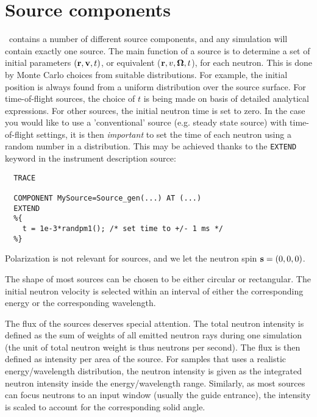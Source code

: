 
\chapter{Source components}
\label{c:source}

\MCS\ contains a number of different source components,
and any simulation will contain exactly one source.
The main function of a source is to determine a set of initial
parameters $({\bf r}, {\bf v}, t)$, or equivalent (${\bf r}, v, \mbox{\boldmath $\Omega$} , t $),
for each neutron. This is done by Monte Carlo choices from
suitable distributions. For example, the initial position is
always found from a uniform distribution over the source surface.
For time-of-flight sources, the choice of $t$ is being made on basis of
detailed analytical expressions.
For other sources, the initial neutron time is set to zero. In the case you would like to use a 'conventional' source (e.g. steady state source) with time-of-flight settings, it is then \emph{important} to set the time of each neutron using a random number in a distribution. This may be achieved thanks to the \verb+EXTEND+ keyword in the instrument description source:

\begin{verbatim}
  TRACE

  COMPONENT MySource=Source_gen(...) AT (...)
  EXTEND
  %{
    t = 1e-3*randpm1(); /* set time to +/- 1 ms */
  %}
\end{verbatim}

Polarization is not relevant for sources,
and we let the neutron spin ${\bf s}=(0,0,0)$.

The shape of most sources can be chosen to be either circular or rectangular.
The initial neutron velocity is selected within an interval
of either the corresponding energy or the corresponding wavelength.

The flux of the sources deserves special attention. The total neutron
intensity is defined as the sum of weights of all emitted neutron rays
during one simulation
(the unit of total neutron weight is thus neutrons per second).
The flux is then defined as intensity per area of the source.
For samples that uses a realistic energy/wavelength distribution,
the neutron intensity is given as the integrated neutron intensity
inside the energy/wavelength range. Similarly, as most sources can focus neutrons to an input window (usually the guide entrance), the intensity is scaled to account for the corresponding solid angle.

